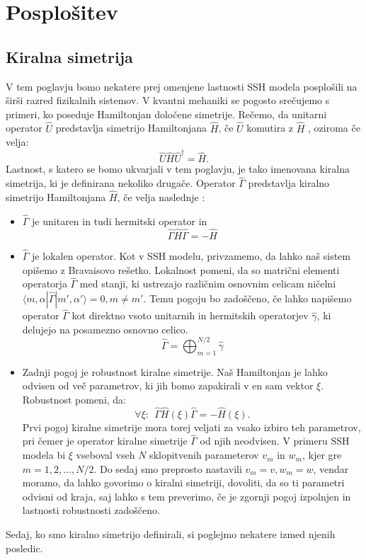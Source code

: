 \section{Posplošitev}
\subsection{Kiralna simetrija}
V tem poglavju bomo nekatere prej omenjene lastnosti SSH modela posplošili na širši razred fizikalnih sistemov.
V kvantni mehaniki se pogosto srečujemo s primeri, ko poseduje Hamiltonjan določene simetrije. Rečemo, da unitarni operator $\hat{U}$ predstavlja simetrijo Hamiltonjana $\hat{H}$, če $\hat{U}$ komutira z $\hat{H}$ \cite{symmetry}, oziroma če velja:
\begin{equation}
\hat{U} \hat{H} \hat{U}^\dagger = \hat{H}.
\end{equation}
Lastnost, s katero se bomo ukvarjali v tem poglavju, je tako imenovana kiralna simetrija, ki je definirana nekoliko drugače. Operator $\hat{\Gamma}$ predstavlja kiralno simetrijo Hamiltonjana $\hat{H}$, če velja naslednje \cite{madzar}:
\begin{itemize}
 \item $\hat{\Gamma}$ je unitaren in tudi hermitski operator in
\begin{equation}
\hat{\Gamma} \hat{H} \hat{\Gamma} = - \hat{H}
\end{equation}
\item $\hat{\Gamma}$ je lokalen operator. Kot v SSH modelu, privzamemo, da lahko naš sistem opišemo z Bravaisovo rešetko. Lokalnost pomeni, da so matrični elementi operatorja $\hat{\Gamma}$ med stanji, ki ustrezajo različnim osnovnim celicam ničelni $\langle m, \alpha | \hat{\Gamma} | m' , \alpha' \rangle = 0,  m \neq m'$. Temu pogoju bo zadoščeno, če lahko napišemo operator $\hat{\Gamma}$ kot direktno vsoto unitarnih in hermitskih operatorjev $\hat{\gamma}$, ki delujejo na posamezno osnovno celico.
\begin{equation}
\hat{\Gamma} = \bigoplus_{m=1}^{N/2} \hat{\gamma}
\end{equation}
\item Zadnji pogoj je robustnost kiralne simetrije. Naš Hamiltonjan je lahko odvisen od več parametrov, ki jih bomo zapakirali v en sam vektor $\xi$. Robustnost pomeni, da:
\begin{equation}
\forall \xi:\ \    \hat{\Gamma} \hat{H}(\xi) \hat{\Gamma} = - \hat{H}(\xi).
\end{equation}
Prvi pogoj kiralne simetrije mora torej veljati za vsako izbiro teh parametrov, pri čemer je operator kiralne simetrije $\hat{\Gamma}$ od njih neodvisen. V primeru SSH modela bi $\xi$ vseboval vseh $N$ sklopitvenih parameterov $v_m$ in $w_m$, kjer gre $m=1,2, \dots ,N/2$. Do sedaj smo preprosto nastavili $v_m = v, w_m = w$, vendar moramo, da lahko govorimo o kiralni simetriji, dovoliti, da so ti parametri odvisni od kraja, saj lahko s tem preverimo, če je zgornji pogoj izpolnjen in lastnosti robustnosti zadoščeno.
\end{itemize}
Sedaj, ko smo kiralno simetrijo definirali, si poglejmo nekatere izmed njenih posledic.
